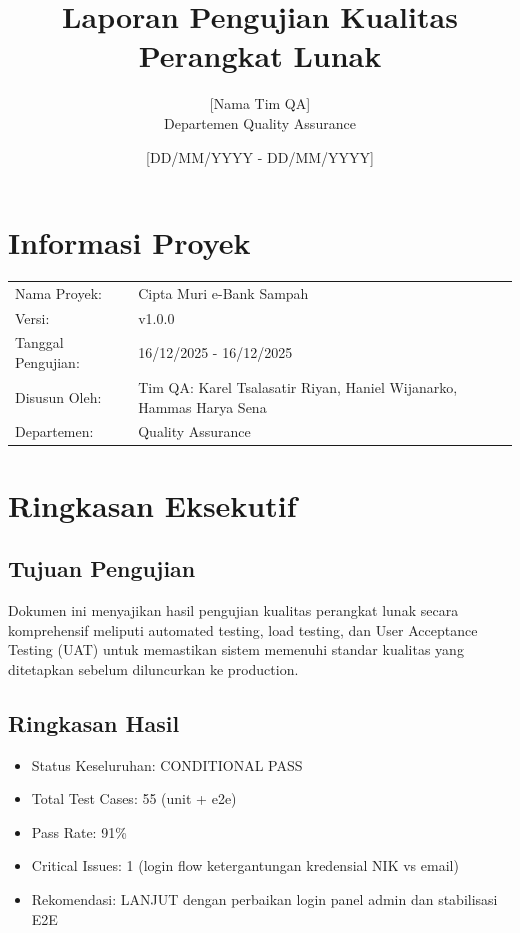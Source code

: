 \documentclass[12pt,a4paper]{article}
\begin{document}
\title{Laporan Pengujian Kualitas Perangkat Lunak}
\author{[Nama Tim QA] \\ Departemen Quality Assurance}
\date{[DD/MM/YYYY - DD/MM/YYYY]}

\maketitle

\section*{Informasi Proyek}
\begin{tabular}{@{}p{4cm}p{10cm}@{}}
Nama Proyek: & Cipta Muri e-Bank Sampah \\
Versi: & v1.0.0 \\
Tanggal Pengujian: & 16/12/2025 - 16/12/2025 \\
Disusun Oleh: & Tim QA: Karel Tsalasatir Riyan, Haniel Wijanarko, Hammas Harya Sena \\
Departemen: & Quality Assurance \\
\end{tabular}

\section{Ringkasan Eksekutif}
\subsection{Tujuan Pengujian}
Dokumen ini menyajikan hasil pengujian kualitas perangkat lunak secara komprehensif meliputi automated testing, load testing, dan User Acceptance Testing (UAT) untuk memastikan sistem memenuhi standar kualitas yang ditetapkan sebelum diluncurkan ke production.

\subsection{Ringkasan Hasil}
\begin{itemize}
  \item Status Keseluruhan: CONDITIONAL PASS
  \item Total Test Cases: 55 (unit + e2e)
  \item Pass Rate: 91\%
  \item Critical Issues: 1 (login flow ketergantungan kredensial NIK vs email)
  \item Rekomendasi: LANJUT dengan perbaikan login panel admin dan stabilisasi E2E
\end{itemize}
\end{document}

